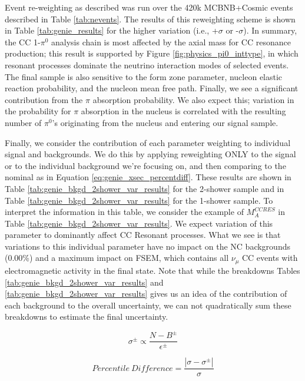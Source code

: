 \par Event re-weighting as described was run over the 420k MCBNB+Cosmic events described in Table \ref{tab:nevents}. The results of this reweighting scheme is shown in Table \ref{tab:genie_results} for the higher variation (i.e., +$\sigma$ or -$\sigma$). In summary, the CC 1-$\pi^0$ analysis chain is most affected by the axial mass for CC resonance production;  this result is supported by Figure \ref{fig:physics_pi0_inttype}, in which resonant processes dominate the neutrino interaction modes of selected events. The final sample is also sensitive to the form zone parameter, nucleon elastic reaction probability, and the nucleon mean free path.   Finally, we see a significant contribution from the $\pi$ absorption probability. We also expect this; variation in the probability for $\pi$ absorption in the nucleus is correlated with the resulting number of $\pi^0$'s originating from the nucleus and entering our signal sample.  

\par Finally, we consider the contribution of each parameter weighting to individual signal and backgrounds.  We do this by applying reweighting ONLY to the signal or to the individual  background we're focusing on, and then comparing to the nominal as in Equation \ref{eq:genie_xsec_percentdiff}. These results are shown in Table \ref{tab:genie_bkgd_2shower_var_results} for the 2-shower sample and in Table \ref{tab:genie_bkgd_2shower_var_results} for the 1-shower sample. To interpret the information in this table, we consider the example of $M_A^{CCRES}$ in Table \ref{tab:genie_bkgd_2shower_var_results}. We expect variation of this parameter to dominantly affect CC Resonant processes.  What we see is that variations to this individual parameter have no impact on the NC backgrounds (0.00\%) and a maximum impact on FSEM, which contains all $\nu_\mu$ CC events with electromagnetic activity in the final state. 
Note that while the breakdowns Tables \ref{tab:genie_bkgd_2shower_var_results} and \ref{tab:genie_bkgd_2shower_var_results} gives us an idea of the contribution of each background to the overall uncertainty, we can not quadratically sum these breakdowns to estimate the final uncertainty. 

\begin{equation} \label{eq:genie_xsec_var}
  \sigma^\pm \propto \frac{N - B^\pm}{\epsilon^\pm} 
\end{equation}

\begin{equation} \label{eq:genie_xsec_percentdiff}
  Percentile\ Difference = \frac{| \sigma - \sigma^\pm |}{\sigma} 
\end{equation}

